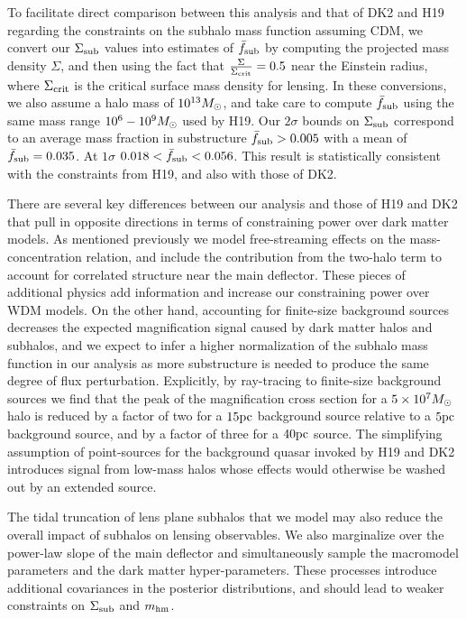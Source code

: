 To facilitate direct comparison between this analysis and that of DK2 and H19 regarding the constraints on the subhalo mass function assuming CDM, we convert our $\Sigma_{\rm{sub}}$ values into estimates of ${\bar{f}_{\rm{sub}}}$ by computing the projected mass density $\Sigma$, and then using the fact that $\frac{\Sigma}{\Sigma_{\rm{crit}}} = 0.5$ near the Einstein radius, where $\Sigma_{\rm{crit}}$ is the critical surface mass density for lensing. In these conversions, we also assume a halo mass of $10^{13} {M_{\odot}}$, and take care to compute ${\bar{f}_{\rm{sub}}}$ using the same mass range $10^6 -10^9 {M_{\odot}}$ used by H19. Our $2 \sigma$ bounds on $\Sigma_{\rm{sub}}$ correspond to an average mass fraction in substructure ${\bar{f}_{\rm{sub}}} > 0.005$ with a mean of ${\bar{f}_{\rm{sub}}} = 0.035$. At $1 \sigma$ $0.018 < {\bar{f}_{\rm{sub}}} < 0.056$. This result is statistically consistent with the constraints from H19, and also with those of DK2. 

There are several key differences between our analysis and those of H19 and DK2 that pull in opposite directions in terms of constraining power over dark matter models. As mentioned previously we model free-streaming effects on the mass-concentration relation, and include the contribution from the two-halo term to account for correlated structure near the main deflector. These pieces of additional physics add information and increase our constraining power over WDM models. On the other hand, accounting for finite-size background sources decreases the expected magnification signal caused by dark matter halos and subhalos, and we expect to infer a higher normalization of the subhalo mass function in our analysis as more substructure is needed to produce the same degree of flux perturbation. Explicitly, by ray-tracing to finite-size background sources we find that the peak of the magnification cross section for a $5\times 10^7 {M_{\odot}}$ halo is reduced by a factor of two for a $15 \rm{pc}$ background source relative to a $5 \rm{pc}$ background source, and by a factor of three for a $40 \rm{pc}$ source. The simplifying assumption of point-sources for the background quasar invoked by H19 and DK2 introduces signal from low-mass halos whose effects would otherwise be washed out by an extended source. 

The tidal truncation of lens plane subhalos that we model may also reduce the overall impact of subhalos on lensing observables. We also marginalize over the power-law slope of the main deflector and simultaneously sample the macromodel parameters and the dark matter hyper-parameters. These processes introduce additional covariances in the posterior distributions, and should lead to weaker constraints on $\Sigma_{\rm{sub}}$ and ${m_{\rm{hm}}}$.  

